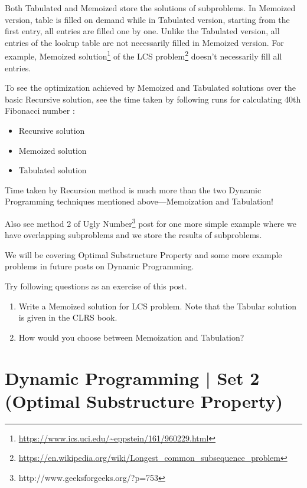 Both Tabulated and Memoized store the solutions of subproblems. In Memoized
version, table is filled on demand while in Tabulated version, starting from
the first entry, all entries are filled one by one. Unlike the Tabulated
version, all entries of the lookup table are not necessarily filled in
Memoized version. For example, Memoized
solution\footnote{\url{https://www.ics.uci.edu/~eppstein/161/960229.html}}
of the LCS
problem\footnote{\url{https://en.wikipedia.org/wiki/Longest\_common\_subsequence\_problem}}
doesn't necessarily fill all entries.

To see the optimization achieved by Memoized and Tabulated solutions over
the basic Recursive solution, see the time taken by following runs for
calculating 40th Fibonacci number :
\begin{itemize}%
\item Recursive solution
\item Memoized solution
\item Tabulated solution
\end{itemize}

Time taken by Recursion method is much more than the two Dynamic Programming
techniques mentioned above---Memoization and Tabulation!

Also see method 2 of Ugly
Number\footnote{http://www.geeksforgeeks.org/?p=753} post for one more
simple example where we have overlapping subproblems and we store the
results of subproblems.

We will be covering Optimal Substructure Property and some more example
problems in future posts on Dynamic Programming.

Try following questions as an exercise of this post.
\begin{enumerate}[label=\textbf{\arabic*.}]
\item Write a Memoized solution for LCS problem. Note that the Tabular
  solution is given in the CLRS book.
\item How would you choose between Memoization and Tabulation?
\end{enumerate}



\section{Dynamic Programming | Set 2 (Optimal Substructure Property)
  \label{secGFGDPSet2OptimalSubstruct}}

